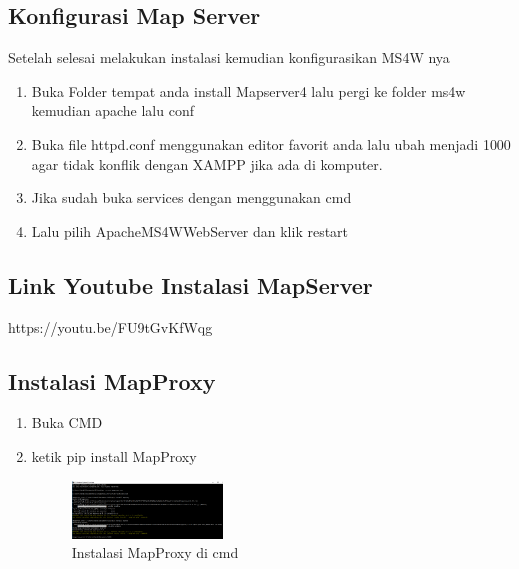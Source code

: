 \subsection{Konfigurasi Map Server}
Setelah selesai melakukan instalasi kemudian konfigurasikan MS4W nya
\begin{enumerate}
  \item Buka Folder tempat anda install Mapserver4 lalu pergi ke folder ms4w kemudian apache lalu conf
  
  \item Buka file httpd.conf menggunakan editor favorit anda lalu ubah menjadi 1000 agar tidak konflik dengan XAMPP jika ada di komputer.
  
  \item Jika sudah buka services dengan menggunakan cmd
  \hfill\break
   
  \item Lalu pilih ApacheMS4WWebServer dan klik restart
  \hfill\break
  
\end{enumerate}

\subsection{Link Youtube Instalasi MapServer}
https://youtu.be/FU9tGvKfWqg

\subsection{Instalasi MapProxy}
\begin{enumerate}
  \item Buka CMD
  \item ketik pip install MapProxy
  \hfill\break
  \begin{figure}[H]
  \includegraphics[width=4cm]{figures/tugas4/1174080/pip_proxy.PNG}
  \centering
  \caption{Instalasi MapProxy di cmd}
  \end{figure}
\end{enumerate}

